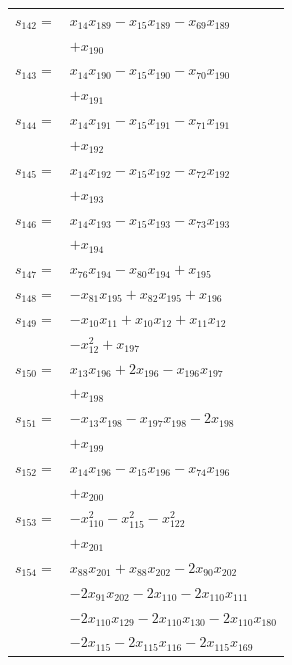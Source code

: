 \begin{longtable}{@{}r@{\;}l@{}}
\(s_{142}=\) & \(\displaystyle x_{14}x_{189} -x_{15}x_{189} -x_{69}x_{189}\) \\
 & \(\displaystyle +x_{190}\) \\[3pt]
\(s_{143}=\) & \(\displaystyle x_{14}x_{190} -x_{15}x_{190} -x_{70}x_{190}\) \\
 & \(\displaystyle +x_{191}\) \\[3pt]
\(s_{144}=\) & \(\displaystyle x_{14}x_{191} -x_{15}x_{191} -x_{71}x_{191}\) \\
 & \(\displaystyle +x_{192}\) \\[3pt]
\(s_{145}=\) & \(\displaystyle x_{14}x_{192} -x_{15}x_{192} -x_{72}x_{192}\) \\
 & \(\displaystyle +x_{193}\) \\[3pt]
\(s_{146}=\) & \(\displaystyle x_{14}x_{193} -x_{15}x_{193} -x_{73}x_{193}\) \\
 & \(\displaystyle +x_{194}\) \\[3pt]
\(s_{147}=\) & \(\displaystyle x_{76}x_{194} -x_{80}x_{194} +x_{195}\) \\[3pt]
\(s_{148}=\) & \(\displaystyle -x_{81}x_{195} +x_{82}x_{195} +x_{196}\) \\[3pt]
\(s_{149}=\) & \(\displaystyle -x_{10}x_{11} +x_{10}x_{12} +x_{11}x_{12}\) \\
 & \(\displaystyle -x_{12}^{2} +x_{197}\) \\[3pt]
\(s_{150}=\) & \(\displaystyle x_{13}x_{196} +2x_{196} -x_{196}x_{197}\) \\
 & \(\displaystyle +x_{198}\) \\[3pt]
\(s_{151}=\) & \(\displaystyle -x_{13}x_{198} -x_{197}x_{198} -2x_{198}\) \\
 & \(\displaystyle +x_{199}\) \\[3pt]
\(s_{152}=\) & \(\displaystyle x_{14}x_{196} -x_{15}x_{196} -x_{74}x_{196}\) \\
 & \(\displaystyle +x_{200}\) \\[3pt]
\(s_{153}=\) & \(\displaystyle -x_{110}^{2} -x_{115}^{2} -x_{122}^{2}\) \\
 & \(\displaystyle +x_{201}\) \\[3pt]
\(s_{154}=\) & \(\displaystyle x_{88}x_{201} +x_{88}x_{202} -2x_{90}x_{202}\) \\
 & \(\displaystyle -2x_{91}x_{202} -2x_{110} -2x_{110}x_{111}\) \\
 & \(\displaystyle -2x_{110}x_{129} -2x_{110}x_{130} -2x_{110}x_{180}\) \\
 & \(\displaystyle -2x_{115} -2x_{115}x_{116} -2x_{115}x_{169}\) \\

\end{longtable}
